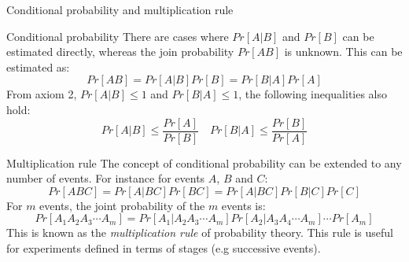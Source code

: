 \documentclass[8pt]{beamer}
\begin{document}
\begin{frame}{Conditional probability and multiplication rule}
    
    \begin{block}{Conditional probability}
        There are cases where $Pr[A | B]$ and $Pr[B]$ can be estimated directly, whereas the join probability $Pr[AB]$ is unknown. This can be estimated as:
$$
Pr[AB] = Pr[A | B] Pr[B] = Pr[B | A] Pr[A]
$$
From \alert{axiom 2}, $Pr[A | B] \leq 1$ and $Pr[B | A] \leq 1$, the following inequalities also hold:
$$
Pr[A | B] \leq \frac{Pr[A]}{Pr[B]} \quad Pr[B | A] \leq \frac{Pr[B]}{Pr[A]}
$$
        \end{block}

    \begin{block}{Multiplication rule}
        The concept of conditional probability can be extended to any number of events. For instance for events $A$, $B$ and $C$:
        $$
        Pr[ABC] = Pr[A | BC] Pr[BC] = Pr[A | BC] Pr[B | C] Pr[C]
        $$
        For $m$ events, the joint probability of the $m$ events is:
$$
Pr[A_1 A_2 A_3 \cdots A_m ] = Pr[A_1 | A_2 A_3 \cdots A_m ] Pr[A_2 | A_3 A_4 \cdots A_m] \cdots Pr[A_m]
$$
This is known as the \emph{multiplication rule} of probability theory. This rule is useful for experiments defined in terms of stages (e.g successive events). 
        \end{block}

\end{frame}
\end{document}
